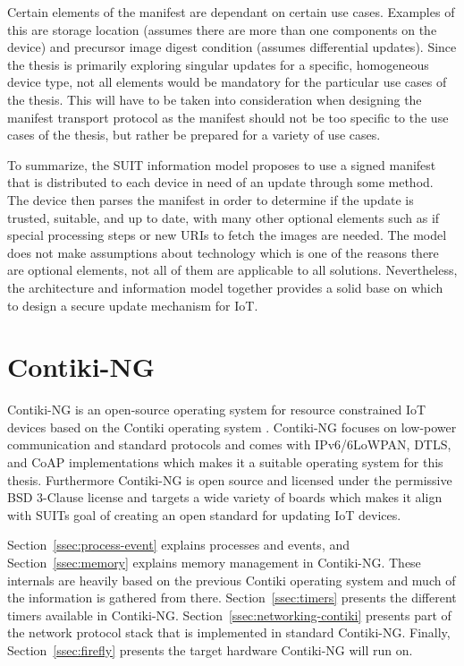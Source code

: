 \documentclass[0-thesis.tex]{subfiles}
\begin{document}

Certain elements of the manifest are dependant on certain use cases. Examples of this are
storage location (assumes there are more than one components on the device) and precursor
image digest condition (assumes differential updates). Since the thesis is primarily
exploring singular updates for a specific, homogeneous device type, not all elements would
be mandatory for the particular use cases of the thesis. This will have to be taken into
consideration when designing the manifest transport protocol as the manifest should not be
too specific to the use cases of the thesis, but rather be prepared for a variety of use
cases.

To summarize, the SUIT information model proposes to use a signed manifest that is
distributed to each device in need of an update through some method. The device then
parses the manifest in order to determine if the update is trusted, suitable, and up to
date, with many other optional elements such as if special processing steps or new URIs to
fetch the images are needed. The model does not make assumptions about technology which is
one of the reasons there are optional elements, not all of them are applicable to all
solutions. Nevertheless, the architecture and information model together provides a solid
base on which to design a secure update mechanism for IoT.

\section{Contiki-NG}
\label{sec:contiki-ng}
Contiki-NG is an open-source operating system for resource constrained IoT devices based
on the Contiki operating system \parencite{contiki-ng-github, contiki-github}.
Contiki-NG focuses on low-power communication and standard protocols and comes with
IPv6/6LoWPAN, DTLS, and CoAP implementations which makes it a suitable operating system for
this thesis. Furthermore Contiki-NG is open source and licensed under the permissive BSD
3-Clause license and targets a wide variety of boards which makes it align with SUITs goal
of creating an open standard for updating IoT devices.

Section~\ref{ssec:process-event} explains processes and events, and
Section~\ref{ssec:memory} explains memory management in Contiki-NG. These internals are
heavily based on the previous Contiki operating system and much of the information is
gathered from there. Section~\ref{ssec:timers} presents the different timers available in
Contiki-NG. Section~\ref{ssec:networking-contiki} presents part of the network protocol
stack that is implemented in standard Contiki-NG. Finally, Section~\ref{ssec:firefly}
presents the target hardware Contiki-NG will run on.
\end{document}
